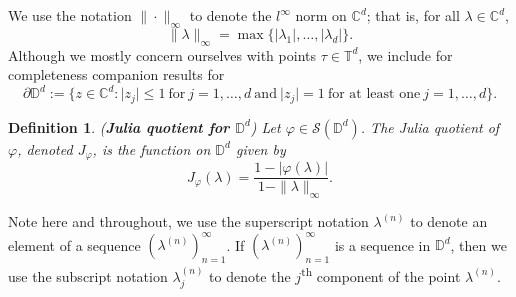 \documentclass[11pt, reqno]{amsart}
\newtheorem{definition}[theorem]{Definition}
\newcommand\1{\boldsymbol {1}}
\numberwithin{equation}{section}
\begin{document}
We use the notation $\| \cdot \|_{\infty}$ to denote the $l^{\infty}$ norm on $\mathbb{C}^{d}$; that is, for all $\lambda\in\mathbb{C}^{d}$, 
$$\|\lambda \|_{\infty} = \max\{\lvert\lambda_{1}\rvert,\hdots, \lvert\lambda_{d}\rvert\}.$$
Although we mostly concern ourselves with points $\tau\in\mathbb{T}^{d}$, we include for completeness companion results for
$$\partial\mathbb{D}^{d}:= \big\{z\in\mathbb{C}^{d}:\lvert z_{j} \rvert \leq 1 ~\text{for}~j=1,\hdots, d~\text{and}~\lvert z_{j}\rvert=1~\text{for at least one}~j=1,\hdots, d \big\}.$$
\begin{definition}{\normalfont\label{JuliaQuotientOnDd}({\bf{Julia quotient for $\mathbb{D}^{d}$}})}
Let $\varphi \in \mathcal{S}(\mathbb{D}^{d})$. The Julia quotient of $\varphi$, denoted $J_{\varphi}$, is the function on $\mathbb{D}^{d}$ given by
$$J_{\varphi}({\lambda})=\dfrac{1-\lvert{\varphi(\lambda)}\rvert}{1-\|{\lambda}\|_{\infty}}.$$
\end{definition}
Note here and throughout, we use the superscript notation $\lambda^{(n)}$ to denote an element of a sequence $(\lambda^{(n)})_{n=1}^{\infty}$. If $(\lambda^{(n)})_{n=1}^{\infty}$ is a sequence in $\mathbb{D}^{d}$, then we use the subscript notation $\lambda^{(n)}_{j}$ to denote the $j$\textsuperscript{th} component of the point $\lambda^{(n)}$.
\end{document}
